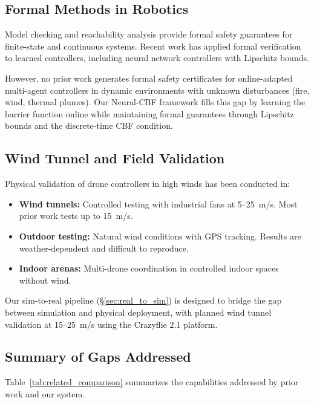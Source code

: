 \documentclass[12pt,a4paper]{article}
\begin{document}
\subsection{Formal Methods in Robotics}

Model checking \cite{Clarke1999} and reachability analysis \cite{Althoff2015} provide formal safety guarantees for finite-state and continuous systems. Recent work has applied formal verification to learned controllers, including neural network controllers with Lipschitz bounds.

However, no prior work generates formal safety certificates for online-adapted multi-agent controllers in dynamic environments with unknown disturbances (fire, wind, thermal plumes). Our Neural-CBF framework fills this gap by learning the barrier function online while maintaining formal guarantees through Lipschitz bounds and the discrete-time CBF condition.

\subsection{Wind Tunnel and Field Validation}

Physical validation of drone controllers in high winds has been conducted in:

\begin{itemize}[leftmargin=*]
    \item \textbf{Wind tunnels:} Controlled testing with industrial fans at 5--25~m/s. Most prior work tests up to 15~m/s.
    \item \textbf{Outdoor testing:} Natural wind conditions with GPS tracking. Results are weather-dependent and difficult to reproduce.
    \item \textbf{Indoor arenas:} Multi-drone coordination in controlled indoor spaces without wind.
\end{itemize}

Our sim-to-real pipeline (\S\ref{sec:real_to_sim}) is designed to bridge the gap between simulation and physical deployment, with planned wind tunnel validation at 15--25~m/s using the Crazyflie 2.1 platform.

\subsection{Summary of Gaps Addressed}

Table~\ref{tab:related_comparison} summarizes the capabilities addressed by prior work and our system.
\end{document}
